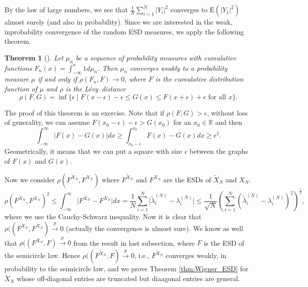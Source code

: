 \documentclass[11pt, a4paper]{article}
\numberwithin{equation}{section}
\newcommand{\E}{\mathrm{E}}
\newcommand{\realR}{\mathbb{R}}
\newcommand{\ie}{i.e.}
\newcommand{\toprobab}{\stackrel{p}{\rightarrow}}
\newcommand{\Levy}{L\'{e}vy}
\newtheorem{thm}{Theorem}
\theoremstyle{definition}
\theoremstyle{remark}
\begin{document}
By the law of large numbers, we see that $\frac{1}{N} \sum^N_{i = 1} \lvert Y_i \rvert^2$ converges to $\E(\lvert Y_1 \rvert^2)$ almost surely (and also in probability). Since we are interested in the weak, inprobability convergence of the random ESD measures, we apply the following theorem.
\begin{thm}[{\protect\cite[Exercise 9 in Section 4.4]{Chung01}}] \label{thm:Levy_dist}
  Let $\mu_n$ be a sequence of probability measures with cumulative functions $F_n(x) = \int^x_{-\infty} 1 d\mu_n$. Then $\mu_n$ converges weakly to a probability measure $\mu$ if and only if $\rho(F_n, F) \to 0$, where $F$ is the cumulative distribution function of $\mu$ and $\rho$ is the \Levy\ distance
  \begin{equation}
    \rho(F, G) = \inf \{ \epsilon \mid F(x - \epsilon) - \epsilon \leq G(x) \leq F(x + \epsilon) + \epsilon \text{ for all $x$} \}.
  \end{equation}
\end{thm}
The proof of this theorem is an exercise. Note that if $\rho(F, G) > \epsilon$, without loss of generality, we can assume $F(x_0 - \epsilon) - \epsilon > G(x_0)$ for an $x_0 \in \realR$ and then
\begin{equation}
  \int^{\infty}_{-\infty} \lvert F(x) - G(x) \rvert dx \geq \int^{x_0}_{x_0 - \epsilon} F(x) - G(x) dx \geq \epsilon^2.
\end{equation}
Geometrically, it means that we can put a square with size $\epsilon$ between the graphs of $F(x)$ and $G(x)$. 

Now we consider $\rho(F^{\tilde{X}_N}, F^{X_N})$ where $F^{\tilde{X}_N}$ and $F^{X_N}$ are the ESDs of $\tilde{X}_N$ and $X_N$.
\begin{equation} \label{eq:levy_dist_diag_entries}
  \rho(F^{\tilde{X}_N}, F^{X_N})^2 \leq \int^{\infty}_{-\infty} \lvert F^{\tilde{X}_N} - F^{X_N} \rvert dx = \frac{1}{N} \sum^N_{i = 1} \lvert \tilde{\lambda}^{(N)}_i - \lambda^{(N)}_i \rvert \leq \frac{1}{\sqrt{N}} \left( \sum^N_{i = 1} (\tilde{\lambda}^{(N)}_i - \lambda^{(N)}_i)^2 \right)^{\frac{1}{2}},
\end{equation}
where we use the Cauchy-Schwarz inequality. Now it is clear that $\rho((F^{\tilde{X}_N}, F^{X_N}) \toprobab 0$ (actually the convergence is almost sure). We know as well that $\rho((F^{X_N}, F) \toprobab 0$ from the result in last subsection, where $F$ is the ESD of the semicircle law. Hence $\rho((F^{\tilde{X}_N}, F) \toprobab 0$, \ie, $F^{\tilde{X}_N}$ converges weakly, in probability to the seimicircle law, and we prove Theorem \ref{thm:Wigner_ESD} for $\tilde{X}_N$ whose off-diagonal entries are truncated but diaagonal entries are general.
\end{document}
